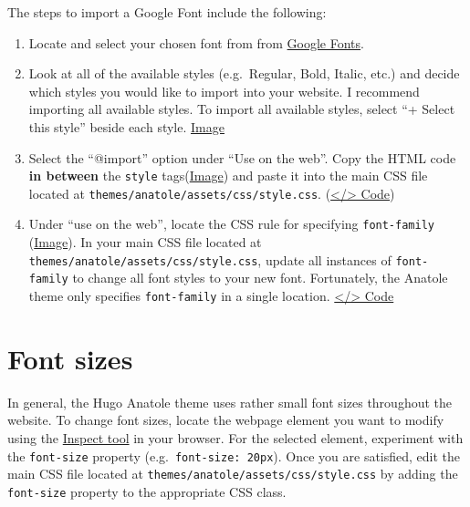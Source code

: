 \documentclass[
]{book}
\begin{document}
The steps to import a Google Font include the following:

\begin{enumerate}
\def\labelenumi{\arabic{enumi}.}
\item
  Locate and select your chosen font from from \href{https://fonts.google.com/}{Google Fonts}.
\item
  Look at all of the available styles (e.g.~Regular, Bold, Italic, etc.) and decide which styles you would like to import into your website. I recommend importing all available styles. To import all available styles, select ``+ Select this style'' beside each style. \href{https://i.imgur.com/ZEopFOB.png}{Image}
\item
  Select the ``@import'' option under ``Use on the web''. Copy the HTML code \textbf{in between} the \texttt{style} tags(\href{https://i.imgur.com/GE1L643.png}{Image}) and paste it into the main CSS file located at \texttt{themes/anatole/assets/css/style.css}. (\href{https://github.com/dannymorris/r4sites-anatole-custom/blob/master/themes/anatole/assets/css/style.css\#L3}{\textless/\textgreater{} Code})
\item
  Under ``use on the web'', locate the CSS rule for specifying \texttt{font-family} (\href{https://i.imgur.com/0Nfmgdw.png}{Image}). In your main CSS file located at \texttt{themes/anatole/assets/css/style.css}, update all instances of \texttt{font-family} to change all font styles to your new font. Fortunately, the Anatole theme only specifies \texttt{font-family} in a single location. \href{https://github.com/dannymorris/r4sites-anatole-custom/blob/master/themes/anatole/assets/css/style.css\#L48}{\textless/\textgreater{} Code}
\end{enumerate}

\hypertarget{font-sizes}{%
\section{Font sizes}\label{font-sizes}}

In general, the Hugo Anatole theme uses rather small font sizes throughout the website. To change font sizes, locate the webpage element you want to modify using the \protect\hyperlink{inspect-tool}{Inspect tool} in your browser. For the selected element, experiment with the \texttt{font-size} property (e.g.~\texttt{font-size:\ 20px}). Once you are satisfied, edit the main CSS file located at \texttt{themes/anatole/assets/css/style.css} by adding the \texttt{font-size} property to the appropriate CSS class.
\end{document}
